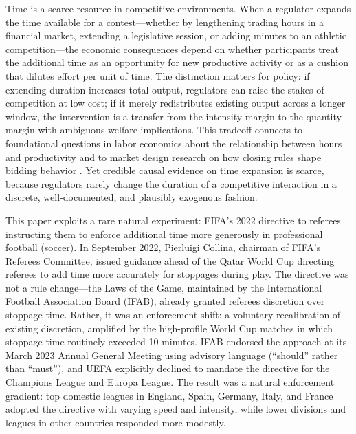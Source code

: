 Time is a scarce resource in competitive environments. When a regulator expands the time available for a contest---whether by lengthening trading hours in a financial market, extending a legislative session, or adding minutes to an athletic competition---the economic consequences depend on whether participants treat the additional time as an opportunity for new productive activity or as a cushion that dilutes effort per unit of time. The distinction matters for policy: if extending duration increases total output, regulators can raise the stakes of competition at low cost; if it merely redistributes existing output across a longer window, the intervention is a transfer from the intensity margin to the quantity margin with ambiguous welfare implications. This tradeoff connects to foundational questions in labor economics about the relationship between hours and productivity \citep{Pencavel2015} and to market design research on how closing rules shape bidding behavior \citep{RothOckenfels2002}. Yet credible causal evidence on time expansion is scarce, because regulators rarely change the duration of a competitive interaction in a discrete, well-documented, and plausibly exogenous fashion.

This paper exploits a rare natural experiment: FIFA's 2022 directive to referees instructing them to enforce additional time more generously in professional football (soccer). In September 2022, Pierluigi Collina, chairman of FIFA's Referees Committee, issued guidance ahead of the Qatar World Cup directing referees to add time more accurately for stoppages during play. The directive was not a rule change---the Laws of the Game, maintained by the International Football Association Board (IFAB), already granted referees discretion over stoppage time. Rather, it was an enforcement shift: a voluntary recalibration of existing discretion, amplified by the high-profile World Cup matches in which stoppage time routinely exceeded 10 minutes. IFAB endorsed the approach at its March 2023 Annual General Meeting using advisory language (``should'' rather than ``must''), and UEFA explicitly declined to mandate the directive for the Champions League and Europa League. The result was a natural enforcement gradient: top domestic leagues in England, Spain, Germany, Italy, and France adopted the directive with varying speed and intensity, while lower divisions and leagues in other countries responded more modestly.


